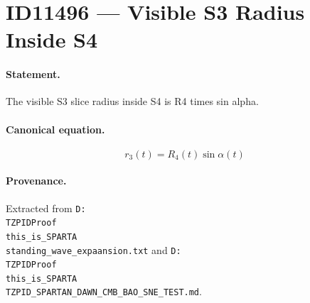 \section*{ID11496 --- Visible S3 Radius Inside S4}

\paragraph{Statement.}
The visible S3 slice radius inside S4 is R4 times sin alpha.

\paragraph{Canonical equation.}
\[
r_3(t)=R_4(t)\sin\alpha(t)
\]

\paragraph{Provenance.}
Extracted from \texttt{D:\\TZPIDProof\\this\_is\_SPARTA\\standing\_wave\_expaansion.txt} and \texttt{D:\\TZPIDProof\\this\_is\_SPARTA\\TZPID\_SPARTAN\_DAWN\_CMB\_BAO\_SNE\_TEST.md}.
